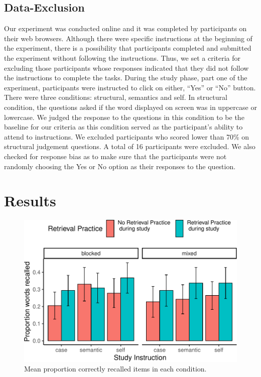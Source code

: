 \documentclass[
  man,floatsintext]{apa6}
\begin{document}
\hypertarget{data-exclusion}{%
\subsection{Data-Exclusion}\label{data-exclusion}}

Our experiment was conducted online and it was completed by participants on their web browsers. Although there were specific instructions at the beginning of the experiment, there is a possibility that participants completed and submitted the experiment without following the instructions. Thus, we set a criteria for excluding those participants whose responses indicated that they did not follow the instructions to complete the tasks. During the study phase, part one of the experiment, participants were instructed to click on either, ``Yes'' or ``No'' button. There were three conditions: structural, semantics and self. In structural condition, the questions asked if the word displayed on screen was in uppercase or lowercase. We judged the response to the questions in this condition to be the baseline for our criteria as this condition served as the participant's ability to attend to instructions. We excluded participants who scored lower than 70\% on structural judgement questions. A total of 16 participants were excluded. We also checked for response bias as to make sure that the participants were not randomly choosing the Yes or No option as their responses to the question.

\hypertarget{results}{%
\section{Results}\label{results}}

\begin{figure}
\centering
\includegraphics{5001_paper_files/figure-latex/fig-recall-E1-1.pdf}
\caption{\label{fig:fig-recall-E1}Mean proportion correctly recalled items in each condition.}
\end{figure}
\end{document}
